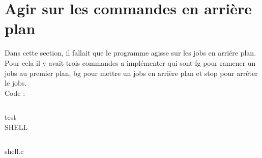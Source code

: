 \documentclass{report}
\begin{document}
		\section{Agir sur les commandes en arri\`ere plan}
			Dans cette section, il fallait que le programme agisse sur les jobs en arri\'ere plan. Pour cela il y avait trois commandes a impl\'ementer qui sont fg pour ramener un jobs au premier plan, bg pour mettre un jobs en arri\`ere plan et stop pour arr\^eter le jobs.\\Code : 
			\begin{lstlisting}
			\end{lstlisting}
			test \\ SHELL
			\begin{lstlisting}[frame=single,basicstyle=\footnotesize,language=bash]
			\end{lstlisting}
			shell.c 
			\begin{lstlisting}[frame=single,basicstyle=\footnotesize,language=bash]
			\end{lstlisting}
\end{document}
